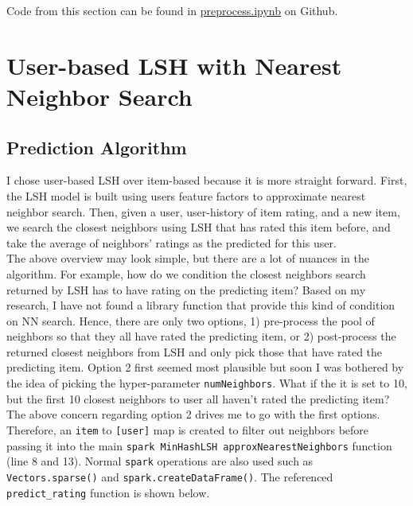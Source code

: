 \documentclass{scrartcl}
\begin{document}
Code from this section can be found in \href{https://github.com/ckwojai/cmpe297-final/blob/main/preprocess.ipynb}{preprocess.ipynb} on Github. \\
\section{User-based LSH with Nearest Neighbor Search}
\subsection{Prediction Algorithm}
I chose user-based LSH over item-based because it is more straight forward. First, the LSH model is built using users feature factors to approximate nearest neighbor search. Then, given a user, user-history of item rating, and a new item, we search the closest neighbors using LSH that has rated this item before, and take the average of neighbors' ratings as the predicted for this user. \\
The above overview may look simple, but there are a lot of nuances in the algorithm. For example,
how do we condition the closest neighbors search returned by LSH has to have rating on the predicting item? Based on my research, I have not found a library function that provide this kind of condition on NN search. Hence, there are only two options, 1) pre-process the pool of neighbors so that they all have rated the predicting item, or 2) post-process the returned closest neighbors from LSH and only pick those that have rated the predicting item. Option 2 first seemed most plausible but soon I was bothered by the idea of picking the hyper-parameter \texttt{numNeighbors}. What if the it is set to 10, but the first 10 closest neighbors to user all haven't rated the predicting item? \\
The above concern regarding option 2 drives me to go with the first options. Therefore, an \texttt{item} to \texttt{[user]} map is created to filter out neighbors before passing it into the main \texttt{spark MinHashLSH approxNearestNeighbors} function (line 8 and 13). Normal \texttt{spark} operations are also used such as \texttt{Vectors.sparse()} and \texttt{spark.createDataFrame()}. The referenced \texttt{predict\_rating} function is shown below.
\end{document}
